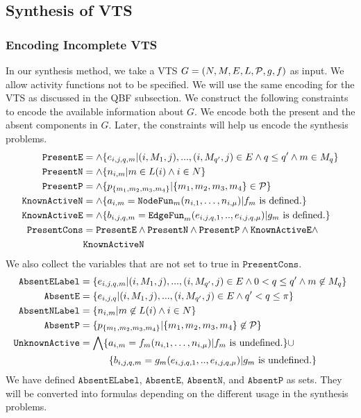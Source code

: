 \subsection{Synthesis of VTS}


\subsubsection{Encoding Incomplete VTS}

In our synthesis method, we take a VTS $G =
(N,M,E,L,\mathcal{P},g,f)$ as input.
%
We allow activity functions not to be specified.
%
We will use the same encoding for the VTS as discussed in the QBF subsection.
%
We construct the following constraints to encode the available information
about $G$.
%
We encode both the present and the absent components in $G$.
%
Later, the constraints will help us encode the synthesis problems.
%
\begin{align*}
\texttt{PresentE} &= \land \{e_{i,j,q,m}|(i,M_1,j),...,(i,M_{q'},j) \in E \land q \leq q' \land m \in M_q \}\\
\texttt{PresentN} &= \land \{n_{i,m}| m \in L(i) \land i \in N \}\\
\texttt{PresentP} &= \land \{p_{\{m_1,m_2,m_3,m_4\}}| \{m_1,m_2,m_3,m_4\} \in \mathcal{P} \} \\
\texttt{KnownActiveN} &= \land \{ a_{i,m} = \texttt{NodeFun}_m (n_{i,1},\dots,n_{i,\mu}) | f_m \text{ is defined.} \} \\
\texttt{KnownActiveE} &= \land \{ b_{i,j,q,m} = \texttt{EdgeFun}_m(e_{i,j,q,1}, .., e_{i,j,q,\mu})
| g_m \text{ is defined.} \} \\
\texttt{PresentCons} & = \texttt{PresentE} \land \texttt{PresentN} \land 
\texttt{PresentP} \land \texttt{KnownActiveE} \land \\
&  \texttt{KnownActiveN}
\end{align*}
We also collect the variables that are not set to true in $\texttt{PresentCons}$.
\begin{align*}
\texttt{AbsentELabel} &=
\{e_{i,j,q,m}|(i,M_1,j),...,(i,M_{q'},j) \in E \land 
0 < q \leq q' \land m \not\in M_{q} \}\\
\texttt{AbsentE} &= \{e_{i,j,q}|(i,M_1,j),...,(i,M_{q'},j) \in E \land 
q' < q \leq \pi \}\\
\texttt{AbsentNLabel} &= \{n_{i,m}| m \not\in L(i) \land i \in N \}\\
\texttt{AbsentP} &= \{p_{\{m_1,m_2,m_3,m_4\}}| {\{m_1,m_2,m_3,m_4\}} \not\in \mathcal{P} \} \\
\texttt{UnknownActive} &=  \bigwedge \{ a_{i,m} = f_m (n_{i,1},\dots,n_{i,\mu}) | f_m \text{ is undefined.} \} {\cup} \\
&\quad\quad\quad  \{ b_{i,j,q,m} = g_m(e_{i,j,q,1}, .., e_{i,j,q,\mu})
| g_m \text{ is undefined.} \}
\end{align*}
We have defined $\texttt{AbsentELabel}$, $\texttt{AbsentE}$, $\texttt{AbsentN}$, and
$\texttt{AbsentP}$
as sets.
%
They will be converted into formulas depending
on the different usage in the synthesis problems. 

